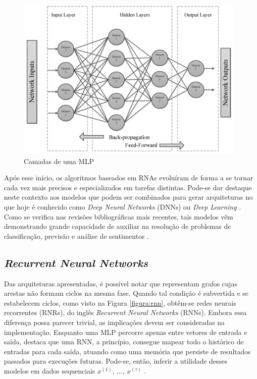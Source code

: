 \begin{figure}[!htb] \centering
  \caption{Camadas de uma MLP} \label{figura:multilayer}
  \begin{varwidth}{\linewidth}
    \includegraphics[width=12cm]{figuras/mlp.png}
  \end{varwidth}
\end{figure}

Após esse início, os algoritmos baseados em RNAs evoluíram de forma a se tornar cada vez mais precisos e especializados em tarefas distintas.
Pode-se dar destaque neste contexto aos modelos
que podem ser combinados para gerar arquiteturas no que hoje é conhecido como \textit{Deep Neural Networks} (DNNs) ou \textit{Deep Learning} \cite{Good}. 
Como se verifica nas revisões bibliográficas mais recentes, tais modelos vêm demonstrando grande capacidade de auxiliar na resolução de problemas de classificação, previsão e análise de sentimentos \cite{Hanc}.

\subsection{\textit{Recurrent Neural Networks}} \label{sec:rnn}

Das arquiteturas apresentadas, é possível notar que representam grafos cujas arestas não formam ciclos na mesma fase.
Quando tal condição é subvertida e se estabelecem ciclos, como visto na Figura \ref{figura:rnn}, obtêm-se redes neurais recorrentes (RNRs), do inglês \textit{Recurrent Neural Networks} (RNNs)\cite{graves}.
Embora essa diferença possa parecer trivial, as implicações devem ser consideradas na implementação.
Enquanto uma MLP percorre apenas entre vetores de entrada e saída, \textcite{graves} destaca que uma RNN, a princípio, consegue mapear todo o histórico de entradas para cada saída, atuando como uma memória que persiste de resultados passados para execuções futuras. 
Pode-se, então, inferir a utilidade desses modelos em dados sequenciais $x^{(1)}$, ..., $x^{(\tau)}$ \cite{Good}.

